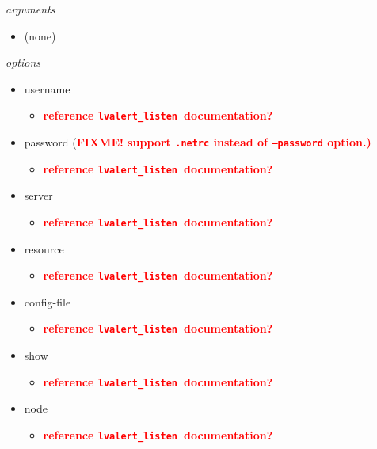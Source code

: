 \documentclass{article}
\newcommand{\FIXME}[1]{\textcolor{red}{\textbf{#1}}}
\newcommand{\lvalertListen}{\texttt{lvalert\_listen}~}
\begin{document}
\vspace{0.5cm}
\noindent
\textit{arguments}
\begin{itemize}
    \item{(none)}
\end{itemize}

\noindent
\textit{options}

\begin{itemize}
    \item{username
        \begin{itemize}
            \item{\FIXME{reference \lvalertListen documentation?}}
        \end{itemize}
         }
    \item{password (\FIXME{FIXME! support \texttt{.netrc} instead of \texttt{--password} option.)}
        \begin{itemize}
            \item{\FIXME{reference \lvalertListen documentation?}}
        \end{itemize}
         }
    \item{server
        \begin{itemize}
            \item{\FIXME{reference \lvalertListen documentation?}}
        \end{itemize}
         }
    \item{resource
        \begin{itemize}
            \item{\FIXME{reference \lvalertListen documentation?}}
        \end{itemize}
         }
    \item{config-file
        \begin{itemize}
            \item{\FIXME{reference \lvalertListen documentation?}}
        \end{itemize}
         }
    \item{show
        \begin{itemize}
            \item{\FIXME{reference \lvalertListen documentation?}}
        \end{itemize}
         }
    \item{node
        \begin{itemize}
            \item{\FIXME{reference \lvalertListen documentation?}}
        \end{itemize}
}
\end{itemize}
\end{document}
